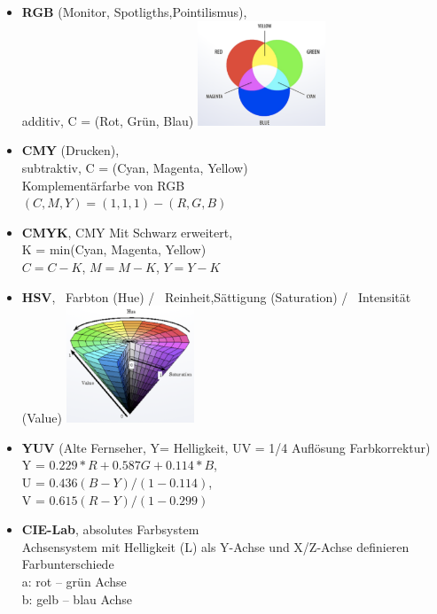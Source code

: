 \begin{itemize}
    \item \textbf{RGB} (Monitor, Spotligths,Pointilismus), \\
          additiv, C = (Rot, Grün, Blau)
          \includegraphics[width=0.3\textwidth]{assets/rgb_additiv.png}
          
    \item \textbf{CMY} (Drucken), \\
          subtraktiv, C = (Cyan, Magenta, Yellow) \\
          Komplementärfarbe von RGB \\
          $(C,M,Y) = (1,1,1) - (R,G,B)$
          
    \item \textbf{CMYK}, CMY Mit Schwarz erweitert, \\
          K = min(Cyan, Magenta, Yellow) \\
          $C = C - K$, $M = M - K$, $Y = Y - K$
          
    \item \textbf{HSV}, \
          Farbton (Hue) / \
          Reinheit,Sättigung (Saturation) / \
          Intensität (Value)
          \includegraphics[width=0.3\textwidth]{assets/hsv_farbsystem.png}
          
    \item \textbf{YUV} (Alte Fernseher, Y= Helligkeit, UV = 1/4 Auflösung Farbkorrektur)\\
          Y = $0.229*R+0.587G+0.114*B$, \\
          U = $0.436(B-Y)/(1-0.114)$, \\
          V = $0.615(R-Y)/(1-0.299)$
          
    \item \textbf{CIE-Lab}, absolutes Farbsystem \\
          Achsensystem mit Helligkeit (L) als Y-Achse und X/Z-Achse definieren Farbunterschiede \\
          a: rot – grün Achse \\
          b: gelb – blau Achse
\end{itemize}

